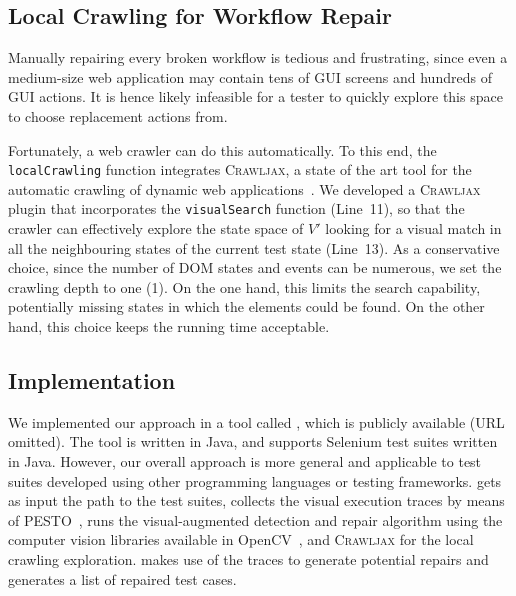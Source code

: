 
\subsection{Local Crawling for Workflow Repair}

Manually repairing every broken workflow is tedious and frustrating, since even a medium-size web application may contain tens of GUI screens and hundreds of GUI actions. It is hence likely infeasible for a tester to quickly explore this space to choose replacement actions from.

Fortunately, a web crawler can do this automatically. To this end, the \texttt{localCrawling} function integrates \textsc{Crawljax}, a state of the art tool for the automatic crawling of dynamic web applications~\cite{mesbah:tweb12,mesbah:tse12}. We developed a \textsc{Crawljax} plugin that incorporates the \texttt{visualSearch} function (Line~11), so that the crawler can effectively explore the state space of $V'$ looking for a visual match in all the neighbouring states of the current test state (Line~13). As a conservative choice, since the number of DOM states and events can be numerous, we set the crawling depth to one (1). On the one hand, this limits the search capability, potentially missing states in which the elements could be found. On the other hand, this choice keeps the running time acceptable.

\subsection{Implementation}\label{sec:implementation}

We implemented our approach in a tool called \tool, which is publicly available (URL omitted). 
The tool is written in Java, and supports Selenium test suites written in Java. However, our overall approach is more general and applicable to test suites developed using other programming languages or testing frameworks. 
\tool gets as input the path to the test suites, collects the visual execution traces by means of \textsc{PESTO}~\cite{2014-Stocco-SCAM}, runs the visual-augmented detection and repair algorithm using the computer vision libraries available in OpenCV~\cite{}, and \textsc{Crawljax} for the local crawling exploration. 
\tool makes use of the traces to generate potential repairs and generates a list of repaired test cases.







